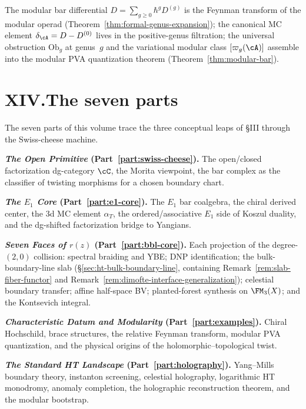 The modular bar differential $D = \sum_{g \ge 0} \hbar^g D^{(g)}$
is the Feynman transform of the modular operad
(Theorem~\ref{thm:formal-genus-expansion}); the canonical MC
element $\delta_\cA = D - D^{(0)}$ lives in the positive-genus
filtration; the universal obstruction $\mathrm{Ob}_g$ at
genus~$g$ and the variational modular class $[\varpi_g(\cA)]$
assemble into the modular PVA quantization theorem
(Theorem~\ref{thm:modular-bar}).

\section*{XIV.\quad The seven parts}

The seven parts of this volume trace the three conceptual leaps
of \S III through the Swiss-cheese machine.

\smallskip
\noindent\textbf{\emph{The Open Primitive}
(Part~\ref{part:swiss-cheese}).}\enspace
The open/closed factorization dg-category $\cC$, the Morita
viewpoint, the bar complex as the classifier of twisting
morphisms for a chosen boundary chart.

\smallskip
\noindent\textbf{\emph{The $E_1$ Core}
(Part~\ref{part:e1-core}).}\enspace
The $E_1$ bar coalgebra, the chiral derived center, the 3d MC
element $\alpha_T$, the ordered/associative $E_1$ side of Koszul
duality, and the dg-shifted factorization bridge to Yangians.

\smallskip
\noindent\textbf{\emph{Seven Faces of $r(z)$}
(Part~\ref{part:bbl-core}).}\enspace
Each projection of the degree-$(2,0)$ collision: spectral
braiding and YBE; DNP identification; the bulk-boundary-line
slab (\S\ref{sec:ht-bulk-boundary-line}, containing
Remark~\ref{rem:slab-fiber-functor} and
Remark~\ref{rem:dimofte-interface-generalization}); celestial
boundary transfer; affine half-space BV; planted-forest
synthesis on $\FM_3(X)$; and the Kontsevich integral.

\smallskip
\noindent\textbf{\emph{Characteristic Datum and Modularity}
(Part~\ref{part:examples}).}\enspace
Chiral Hochschild, brace structures, the relative Feynman
transform, modular PVA quantization, and the physical origins
of the holomorphic--topological twist.

\smallskip
\noindent\textbf{\emph{The Standard HT Landscape}
(Part~\ref{part:holography}).}\enspace
Yang--Mills boundary theory, instanton screening, celestial
holography, logarithmic HT monodromy, anomaly completion, the
holographic reconstruction theorem, and the modular bootstrap.

